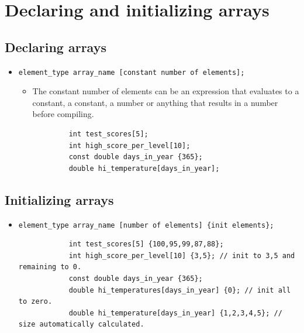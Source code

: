 \section{Declaring and initializing arrays}
\subsection{Declaring arrays}
\begin{itemize}
    \item \verb|element_type array_name [constant number of elements];|
        \begin{itemize}
            \item The constant number of elements can be an expression that evaluates to a constant, a constant, a number or anything that results in a number before compiling.
        \end{itemize}
        \begin{verbatim}
            int test_scores[5];
            int high_score_per_level[10];
            const double days_in_year {365};
            double hi_temperature[days_in_year];
        \end{verbatim}
\end{itemize}

\subsection{Initializing arrays}
\begin{itemize}
    \item \verb|element_type array_name [number of elements] {init elements}; |
        \begin{verbatim}
            int test_scores[5] {100,95,99,87,88};
            int high_score_per_level[10] {3,5}; // init to 3,5 and remaining to 0.
            const double days_in_year {365}; 
            double hi_temperatures[days_in_year] {0}; // init all to zero.
            double hi_temperature[days_in_year] {1,2,3,4,5}; // size automatically calculated.
        \end{verbatim}
\end{itemize}



